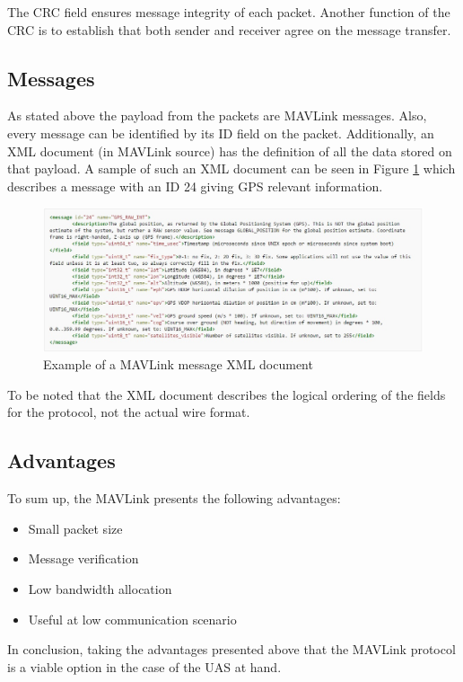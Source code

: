 The CRC field ensures message integrity of each packet. Another function of the CRC is to establish that both sender and receiver agree on the message transfer.

\subsection{Messages}
As stated above the payload from the packets are MAVLink messages. Also, every message can be identified by its ID field on the packet. Additionally, an XML document (in MAVLink source) has the definition of all the data stored on that payload. A sample of such an XML document can be seen in Figure \ref{fig:mav_msg} which describes a message with an ID 24 giving GPS relevant information.

\begin{figure}[H]
	\centering
	\includegraphics[scale=0.5]{figures/mavlink_msg.jpg}
	\caption{Example of a MAVLink message XML document}
	\label{fig:mav_msg}
\end{figure}

To be noted that the XML document describes the logical ordering of the fields for the protocol, not the actual wire format.

\subsection{Advantages}
To sum up, the MAVLink presents the following advantages:
\begin{itemize}
	\item Small packet size
	\item Message verification
	\item Low bandwidth allocation
	\item Useful at low communication scenario
\end{itemize}

In conclusion, taking the advantages presented above that the MAVLink protocol is a viable option in the case of the UAS at hand.
